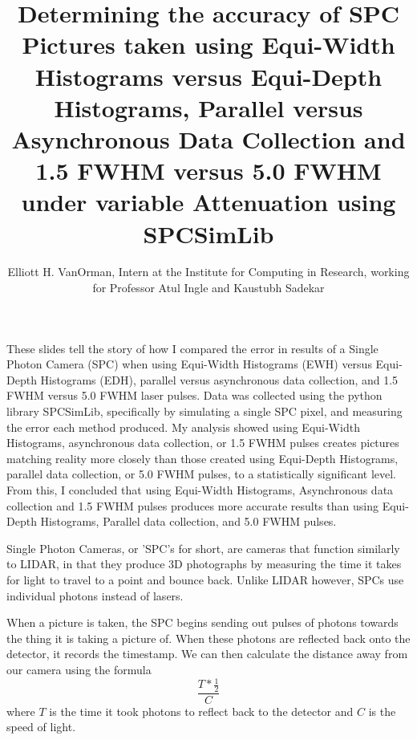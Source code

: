 \documentclass{beamer}
\title{Determining the accuracy of SPC Pictures taken using Equi-Width Histograms versus Equi-Depth Histograms, Parallel versus Asynchronous Data Collection and 1.5 FWHM versus 5.0 FWHM under variable Attenuation using SPCSimLib \cite{spc}}
\author{Elliott H. VanOrman, Intern at the Institute for Computing in Research, working for Professor Atul Ingle and Kaustubh Sadekar}
\begin{document}
\maketitle

\begin{frame}
\end{frame}

\begin{frame}
  These slides tell the story of how I compared the error in results of a Single Photon Camera (SPC) when using Equi-Width Histograms (EWH) versus Equi-Depth Histograms (EDH), parallel versus asynchronous data collection, and 1.5 FWHM versus 5.0 FWHM laser pulses.
  Data was collected using the python library SPCSimLib, specifically by simulating a single SPC pixel, and measuring the error each method produced.
  My analysis showed using Equi-Width Histograms, asynchronous data collection, or 1.5 FWHM pulses creates pictures matching reality more closely than those created using Equi-Depth Histograms, parallel data collection, or 5.0 FWHM pulses, to a statistically significant level.
  From this, I concluded that using Equi-Width Histograms, Asynchronous data collection and 1.5 FWHM pulses produces more accurate results than using Equi-Depth Histograms, Parallel data collection, and 5.0 FWHM pulses.
\end{frame}

\begin{frame}
\end{frame}

\begin{frame}
  Single Photon Cameras, or 'SPC's for short, are cameras that function similarly to LIDAR, in that they produce 3D photographs by measuring the time it takes for light to travel to a point and bounce back. Unlike LIDAR however, SPCs use individual photons instead of lasers. \cite{ingle} \cite{sadekar}
  
  When a picture is taken, the SPC begins sending out pulses of photons towards the thing it is taking a picture of. When these photons are reflected back onto the detector, it records the timestamp. We can then calculate the distance away from our camera using the formula\[\frac{T*\frac{1}{2}}{C}\] where $T$ is the time it took photons to reflect back to the detector and $C$ is the speed of light. \cite{sadekar}
\end{frame}
\end{document}
